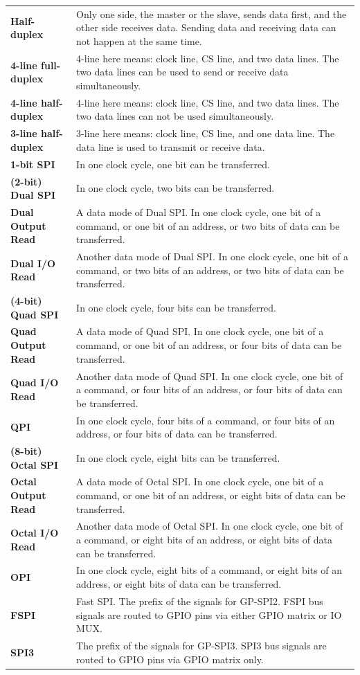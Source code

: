 \begin{longtable}[c]{ R{7cm} p{10cm} }
\textbf{Half-duplex} & Only one side, the master or the slave, sends data first, and the other side receives data. Sending data and receiving data can not happen at the same time.\\
\textbf{4-line full-duplex} & 4-line here means: clock line, CS line, and two data lines. The two data lines can be used to send or receive data simultaneously.\\
\textbf{4-line half-duplex} & 4-line here means: clock line, CS line, and two data lines. The two data lines can not be used simultaneously.\\
\textbf{3-line half-duplex} & 3-line here means: clock line, CS line, and one data line. The data line is used to transmit or receive data. \\
\textbf{1-bit SPI} & In one clock cycle, one bit can be transferred.\\
\textbf{(2-bit) Dual SPI} & In one clock cycle, two bits can be transferred. \\
\textbf{Dual Output Read} & A data mode of Dual SPI. In one clock cycle, one bit of a command, or one bit of an address, or two bits of data can be transferred.\\
\textbf{Dual I/O Read} & Another data mode of Dual SPI. In one clock cycle, one bit of a command, or two bits of an address, or two bits of data can be transferred.\\
\textbf{(4-bit) Quad SPI} & In one clock cycle, four bits can be transferred. \\
\textbf{Quad Output Read} & A data mode of Quad SPI. In one clock cycle, one bit of a command, or one bit of an address, or four bits of data can be transferred.\\
\textbf{Quad I/O Read} & Another data mode of Quad SPI. In one clock cycle, one bit of a command, or four bits of an address, or four bits of data can be transferred.\\
\textbf{QPI} & In one clock cycle, four bits of a command, or four bits of an address, or four bits of data can be transferred.\\

\textbf{(8-bit) Octal SPI} & In one clock cycle, eight bits can be transferred. \\
\textbf{Octal Output Read} & A data mode of Octal SPI. In one clock cycle, one bit of a command, or one bit of an address, or eight bits of data can be transferred.\\
\textbf{Octal I/O Read} & Another data mode of Octal SPI. In one clock cycle, one bit of a command, or eight bits of an address, or eight bits of data can be transferred.\\
\textbf{OPI} & In one clock cycle, eight bits of a command, or eight bits of an address, or eight bits of data can be transferred.\\
\textbf{FSPI} & Fast SPI. The prefix of the signals for GP-SPI2. FSPI bus signals are routed to GPIO pins via either GPIO matrix or IO MUX.\\
\textbf{SPI3} & The prefix of the signals for GP-SPI3. SPI3 bus signals are routed to GPIO pins via GPIO matrix only.

\end{longtable}
